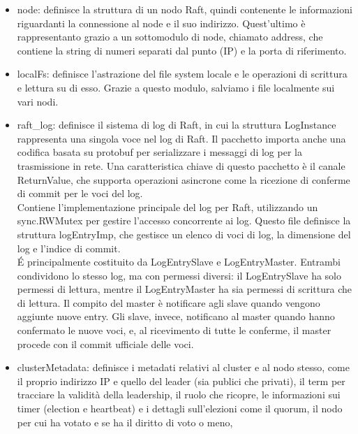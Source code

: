 \begin{itemize}
  \item node: definisce la struttura di un nodo Raft, quindi contenente le informazioni riguardanti la connessione al node e il suo indirizzo. Quest'ultimo è rappresentanto grazio a un sottomodulo di node, chiamato address, 
    che contiene la string di numeri separati dal punto (IP) e la porta di riferimento.

  \item localFs: definisce l'astrazione del file system locale e le operazioni di scrittura e lettura su di esso. Grazie a questo modulo, salviamo i file localmente sui vari nodi.
 
  \item raft\_log: definisce il sistema di log di Raft, in cui la struttura LogInstance rappresenta una singola voce nel log di Raft. Il pacchetto importa anche una codifica basata su protobuf per serializzare i messaggi 
    di log per la trasmissione in rete. Una caratteristica chiave di questo pacchetto è il canale ReturnValue, che supporta operazioni asincrone come la ricezione di conferme di commit per le voci del log. \\
    Contiene l'implementazione principale del log per Raft, utilizzando un sync.RWMutex per gestire l'accesso concorrente ai log. Questo file definisce la struttura logEntryImp, che gestisce un elenco di voci di log, la 
    dimensione del log e l'indice di commit. \\
    \'E principalmente costituito da LogEntrySlave e LogEntryMaster. Entrambi condividono lo stesso log, ma con permessi diversi: il LogEntrySlave ha solo permessi di lettura, mentre il LogEntryMaster ha sia permessi di scrittura 
    che di lettura. Il compito del master è notificare agli slave quando vengono aggiunte nuove entry. Gli slave, invece, notificano al master quando hanno confermato le nuove voci, e, al ricevimento di tutte le conferme, 
    il master procede con il commit ufficiale delle voci.
  
  \item clusterMetadata: definisce i metadati relativi al cluster e al nodo stesso, come il proprio indirizzo IP e quello del leader (sia publici che privati), il term per tracciare la validità della leadership, il ruolo 
    che ricopre, le informazioni sui timer (election e heartbeat) e i dettagli 
    sull'elezioni come il quorum, il nodo per cui ha votato e se ha il diritto di voto o meno, 


\end{itemize}
